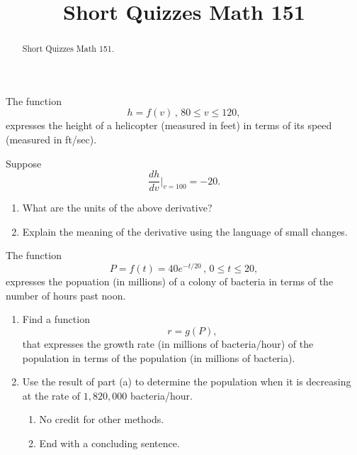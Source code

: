 \documentclass{ximera}
\title{Short Quizzes Math 151}
\begin{document}
\begin{abstract}
Short Quizzes Math 151.
\end{abstract}
\maketitle

\begin{question}  \label{Qddsfsggtgttrghhgfgd}
The function
\[
      h = f(v) \, , \, 80 \leq v \leq 120 ,
\]
expresses the height of a helicopter (measured in feet) in terms of its speed (measured in ft/sec).

Suppose
\[
   \frac{dh}{dv}\Big|_{v=100} = - 20 .
\] 

\begin{enumerate}
\item What are the units of the above derivative?

\item Explain the meaning of the derivative using the language of small changes.
\end{enumerate}

\end{question}

\begin{question} \label{Qbgythjhjhgg}
The function
\[
     P = f(t) = 40e^{-t/20}\, , \, 0\leq t \leq 20 ,
\]
expresses the popuation (in millions) of a colony of bacteria in terms of the number of hours past noon.

\begin{enumerate}
\item Find a function
\[
     r  = g(P),
\]
that expresses the growth rate (in millions of bacteria/hour) of the population in terms of the population (in millions of bacteria).

\item Use the result of part (a) to determine the population when it is decreasing at the rate of $1,820,000$ bacteria/hour.

\begin{enumerate}
\item No credit for other methods.
\item End with a concluding sentence.
\end{enumerate}

\end{enumerate}
\end{question}
\end{document}
